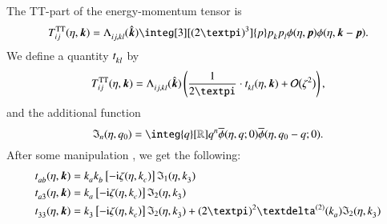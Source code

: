 \begin{draft}
    The TT-part of the energy-momentum tensor is 
    \begin{equation}
        \tensor*{T}{^{\mathrm{TT}}_{ij}}(\eta, \vec{k}) = \tensor{\Lambda}{_{ij,kl}}(\hat{\vec{k}})  \integ[3][(2\ppi)^3]{p}  p\lo{k} p\lo{l} \phi(\eta, \vec{p}) \phi(\eta, \vec{k}-\vec{p}).
    \end{equation}
    We define a quantity $\tensor{t}{_{kl}}$ by
    \begin{equation}
        \tensor*{T}{^{\mathrm{TT}}_{ij}}(\eta, \vec{k}) =  \tensor{\Lambda}{_{ij,kl}}(\hat{\vec{k}}) \pclosed{  \frac{1}{2\ppi} \cdot\tensor{t}{_{kl}}(\eta, \vec{k})  + \BigO{\zeta^2} },
    \end{equation}
    and the additional function 
    \begin{equation}
        \mathfrak{I}_n(\eta, q_0) = \integ{q}[\mathbb{R}] q^n \widebar{\phi}(\eta,q;0) \widebar{\phi}(\eta, q_0-q;0).
    \end{equation}
    After some manipulation , we get the following:
    \begin{subequations}
        \begin{align}
            \tensor{t}{_{ab}} (\eta, \vec{k}) &= k\lo{a} k\lo{b} \bclosed{-\im \zeta(\eta, k\lo{c})} \mathfrak{I}_1(\eta, k\lo{3}) \\
            \tensor{t}{_{a3}} (\eta, \vec{k}) &= k\lo{a} \bclosed{-\im \zeta(\eta, k\lo{c})} \mathfrak{I}_2(\eta, k\lo{3}) \\
            \tensor{t}{_{33}} (\eta, \vec{k}) &= k\lo{3} \bclosed{-\im \zeta(\eta, k\lo{c})} \mathfrak{I}_2(\eta, k\lo{3}) + (2\ppi)^2\Diracdelta[2]{k\lo{a}} \mathfrak{I}_2(\eta,k\lo{3})
        \end{align}
    \end{subequations}


\end{draft}

